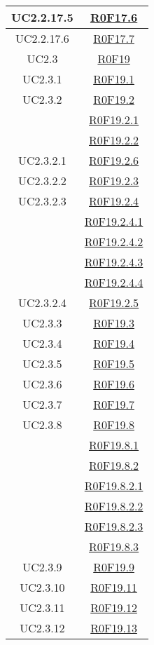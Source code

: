 \documentclass[../AnalisiDeiRequisiti.tex]{subfiles}
\begin{document}
\begin{longtable}{|c|c|}
	UC2.2.17.5 & \hyperlink{R0F17.6}{R0F17.6}\\\hline
	UC2.2.17.6 & \hyperlink{R0F17.7}{R0F17.7}\\\hline
	UC2.3 & \hyperlink{R0F19}{R0F19}\\\hline
	UC2.3.1 & \hyperlink{R0F19.1}{R0F19.1}\\\hline
	UC2.3.2 & \hyperlink{R0F19.2}{R0F19.2}\\& \hyperlink{R0F19.2.1}{R0F19.2.1}\\& \hyperlink{R0F19.2.2}{R0F19.2.2}\\\hline
	UC2.3.2.1 & \hyperlink{R0F19.2.6}{R0F19.2.6}\\\hline
	UC2.3.2.2 & \hyperlink{R0F19.2.3}{R0F19.2.3}\\\hline
	UC2.3.2.3 & \hyperlink{R0F19.2.4}{R0F19.2.4}\\& \hyperlink{R0F19.2.4.1}{R0F19.2.4.1}\\& \hyperlink{R0F19.2.4.2}{R0F19.2.4.2}\\& \hyperlink{R0F19.2.4.3}{R0F19.2.4.3}\\& \hyperlink{R0F19.2.4.4}{R0F19.2.4.4}\\\hline
	UC2.3.2.4 & \hyperlink{R0F19.2.5}{R0F19.2.5}\\\hline
	UC2.3.3 & \hyperlink{R0F19.3}{R0F19.3}\\\hline
	UC2.3.4 & \hyperlink{R0F19.4}{R0F19.4}\\\hline
	UC2.3.5 & \hyperlink{R0F19.5}{R0F19.5}\\\hline
	UC2.3.6 & \hyperlink{R0F19.6}{R0F19.6}\\\hline
	UC2.3.7 & \hyperlink{R0F19.7}{R0F19.7}\\\hline
	UC2.3.8 & \hyperlink{R0F19.8}{R0F19.8}\\& \hyperlink{R0F19.8.1}{R0F19.8.1}\\& \hyperlink{R0F19.8.2}{R0F19.8.2}\\& \hyperlink{R0F19.8.2.1}{R0F19.8.2.1}\\& \hyperlink{R0F19.8.2.2}{R0F19.8.2.2}\\& \hyperlink{R0F19.8.2.3}{R0F19.8.2.3}\\& \hyperlink{R0F19.8.3}{R0F19.8.3}\\\hline
	UC2.3.9 & \hyperlink{R0F19.9}{R0F19.9}\\\hline
	UC2.3.10 & \hyperlink{R0F19.11}{R0F19.11}\\\hline
	UC2.3.11 & \hyperlink{R0F19.12}{R0F19.12}\\\hline
	UC2.3.12 & \hyperlink{R0F19.13}{R0F19.13}\\\hline

\end{longtable}
\end{document}
